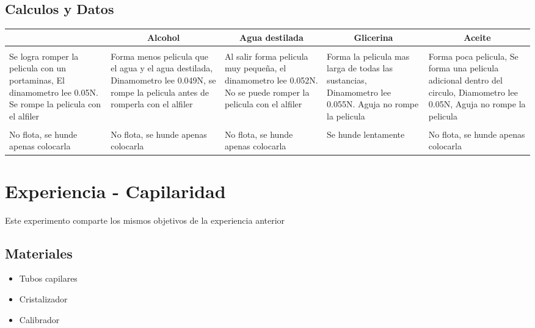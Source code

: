 \documentclass[11pt, letterpaper]{article}
\begin{document}
\subsection{Calculos y Datos}
\begin{center}
    \begin{tabular}{|p{7.5em}|p{7.5em}|p{7.5em}|p{7.5em}|p{7.5em}|}
    \toprule
    \rowcolor[rgb]{ .776,  .878,  .706} \multicolumn{1}{|c|}{Agua} & \multicolumn{1}{|c|}{Alcohol} & \multicolumn{1}{|c|}{Agua destilada} & \multicolumn{1}{|c|}{Glicerina} & \multicolumn{1}{|c|}{Aceite} \\
    \midrule
    \rowcolor[rgb]{ 1,  1,  0} \multicolumn{5}{|c|}{Hoja circular} \\
    \midrule
    Se logra romper la pelicula con un portaminas, El dinamometro lee 0.05N. Se rompe la pelicula con el alfiler & Forma menos pelicula que el agua y el agua destilada, Dinamometro lee 0.049N, se rompe la pelicula antes de romperla con el alfiler & Al salir forma pelicula muy pequeña, el dinamometro lee 0.052N. No se puede romper la pelicula con el alfiler & Forma la pelicula mas larga de todas las sustancias, Dinamometro lee 0.055N. Aguja no rompe la pelicula & Forma poca pelicula, Se forma una pelicula adicional dentro del circulo, Diamometro lee 0.05N, Aguja no rompe la pelicula \\
    \midrule
    \rowcolor[rgb]{ 1,  1,  0} \multicolumn{5}{|c|}{Moneda} \\
    \midrule
    No flota, se hunde apenas colocarla  & No flota, se hunde apenas colocarla  & No flota, se hunde apenas colocarla  & Se hunde lentamente & No flota, se hunde apenas colocarla  \\
    \bottomrule
    \end{tabular}%
\end{center}

\section{Experiencia - Capilaridad}
Este experimento comparte los mismos objetivos de la experiencia anterior
\subsection{Materiales}
\begin{itemize}
	\item Tubos capilares
	\item Cristalizador
	\item Calibrador
\end{itemize}
\end{document}
